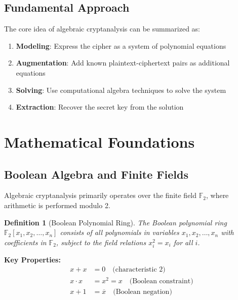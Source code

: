 \documentclass[12pt,a4paper]{article}
\newtheorem{definition}[theorem]{Definition}
\newcommand{\GF}[1]{\mathbb{F}_{#1}}
\newcommand{\poly}[1]{\mathbb{F}_2[#1]}
\begin{document}
\subsection{Fundamental Approach}

\begin{mathematicsbox}
The core idea of algebraic cryptanalysis can be summarized as:
\begin{enumerate}
    \item \textbf{Modeling}: Express the cipher as a system of polynomial equations
    \item \textbf{Augmentation}: Add known plaintext-ciphertext pairs as additional equations
    \item \textbf{Solving}: Use computational algebra techniques to solve the system
    \item \textbf{Extraction}: Recover the secret key from the solution
\end{enumerate}
\end{mathematicsbox}

\section{Mathematical Foundations}

\subsection{Boolean Algebra and Finite Fields}

Algebraic cryptanalysis primarily operates over the finite field $\GF{2}$, where arithmetic is performed modulo 2.

\begin{definition}[Boolean Polynomial Ring]
The Boolean polynomial ring $\poly{x_1, x_2, \ldots, x_n}$ consists of all polynomials in variables $x_1, x_2, \ldots, x_n$ with coefficients in $\GF{2}$, subject to the field relations $x_i^2 = x_i$ for all $i$.
\end{definition}

\begin{mathematicsbox}
\textbf{Key Properties:}
\begin{align}
x + x &= 0 \quad \text{(characteristic 2)} \\
x \cdot x &= x^2 = x \quad \text{(Boolean constraint)} \\
x + 1 &= \overline{x} \quad \text{(Boolean negation)}
\end{align}
\end{mathematicsbox}
\end{document}
